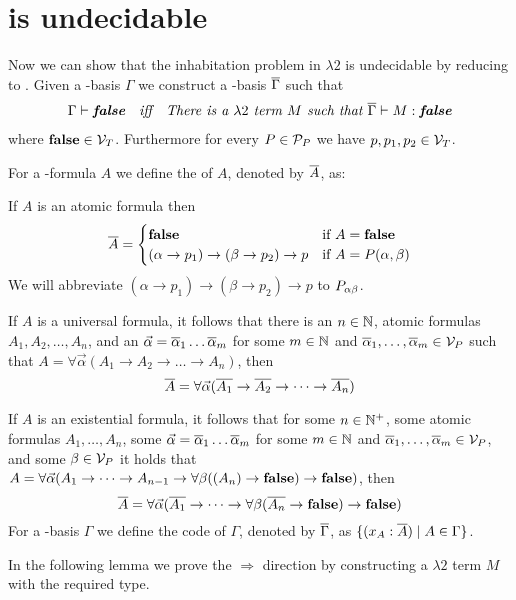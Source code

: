 \section{\lambdaInhab{} is undecidable}
Now we can show that the inhabitation problem in $\lambda2$ %
is undecidable by reducing \PCons{} to \lambdaInhab{}. Given a \SysP-basis $\Gamma$ we construct a \lambdaTwo-basis $\overline{\Gamma}$ such that 
\begin{align*}
\textit{$\Gamma\vdash\textbf{false}$}&&\textit{iff}&&\textit{There is a $\lambda2$ term $M$ such that  $\overline{\Gamma}\vdash M:\textbf{false}$}
\end{align*}
where $\textbf{false}\in\mathcal{V}_T$. Furthermore for every $P\in\mathcal{P}_P$ we have $p,p_1,p_2\in\mathcal{V}_T$. 

\begin{definition}
For a \SysP-formula $A$ we define the  of $A$, denoted by $\overline{A}$, as:

If $A$ is an atomic formula then
\[
\trans{A}=
\begin{cases}
\false &\text{if $A=\false$}\\
(\alpha\to p_1)\to(\beta\to p_2)\to p &\text{if $A=P(\alpha,\beta)$} %
\end{cases}
\]
We will abbreviate $(\alpha\to p_1)\to(\beta\to p_2)\to p$ to $P_{\alpha\beta}$.

If $A$ is a universal formula, it follows that there is an $n\in\mathbb{N}$, atomic formulas $A_1,A_2,\dots,A_n$, and an $\predVec=\predVec[1]\dots\predVec[m]$ for some $m\in\mathbb{N}$ and $\predVec[1],\dots,\predVec[m]\in\VarP$ such that $A=\forall\vec{\alpha}(A_1\to A_2 \to\dots\to A_n)$, then 
\[\trans{A}=\forall\predVec(\trans{A_1}\to \trans{A_2} \to\dots\to\trans{ A_n})\]

If $A$ is an existential formula, it follows that for some $n\in\mathbb{N}^+$, some atomic formulas $A_1,\dots,A_n$, some $\predVec=\predVec[1]\dots\predVec[m]$ for some $m\in\mathbb{N}$ and $\predVec[1],\dots,\predVec[m]\in\VarP$, and some $\beta\in\mathcal{V}_P$ it holds that $A=\forall\vec{\alpha}(A_1 \to\dots\to A_{n-1}\to \forall\beta((A_n)\to\textbf{false})\to\textbf{false})$, then %
\[\trans{A}=\forall\predVec(\trans{A_1}\to\dots\to\forall\beta(\trans{ A_n}\to\false)\to\false)\]
For a \SysP-basis $\Gamma$ we define the code of $\Gamma$, denoted by $\overline{\Gamma}$, as $\{(x_A:\overline{A})\mid A\in\Gamma\}$.
\end{definition}

In the following lemma we prove the $\Rightarrow$ direction by constructing a $\lambda2$ term $M$ with the required type.

